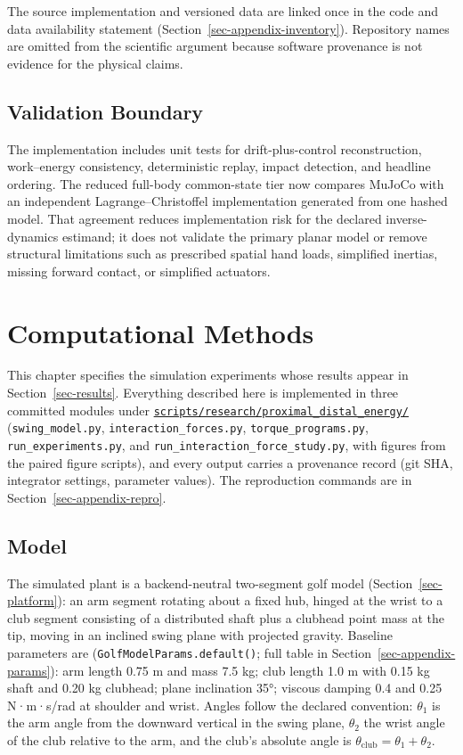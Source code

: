 \documentclass[
  letterpaper,
]{report}
\begin{document}
The source implementation and versioned data are linked once in the code
and data availability statement (Section~\ref{sec-appendix-inventory}).
Repository names are omitted from the scientific argument because
software provenance is not evidence for the physical claims.

\section{Validation Boundary}\label{validation-boundary}

The implementation includes unit tests for drift-plus-control
reconstruction, work--energy consistency, deterministic replay, impact
detection, and headline ordering. The reduced full-body common-state
tier now compares MuJoCo with an independent Lagrange--Christoffel
implementation generated from one hashed model. That agreement reduces
implementation risk for the declared inverse-dynamics estimand; it does
not validate the primary planar model or remove structural limitations
such as prescribed spatial hand loads, simplified inertias, missing
forward contact, or simplified actuators.

\chapter{Computational Methods}\label{sec-methods}

This chapter specifies the simulation experiments whose results appear
in Section~\ref{sec-results}. Everything described here is implemented
in three committed modules under
\href{https://github.com/D-sorganization/UpstreamDrift/tree/main/scripts/research/proximal_distal_energy}{\texttt{scripts/research/proximal\_distal\_energy/}}
(\texttt{swing\_model.py}, \texttt{interaction\_forces.py},
\texttt{torque\_programs.py}, \texttt{run\_experiments.py}, and
\texttt{run\_interaction\_force\_study.py}, with figures from the paired
figure scripts), and every output carries a provenance record (git SHA,
integrator settings, parameter values). The reproduction commands are in
Section~\ref{sec-appendix-repro}.

\section{Model}\label{sec-methods-model}

The simulated plant is a backend-neutral two-segment golf model
(Section~\ref{sec-platform}): an arm segment rotating about a fixed hub,
hinged at the wrist to a club segment consisting of a distributed shaft
plus a clubhead point mass at the tip, moving in an inclined swing plane
with projected gravity. Baseline parameters are
(\texttt{GolfModelParams.default()}; full table in
Section~\ref{sec-appendix-params}): arm length 0.75 m and mass 7.5 kg;
club length 1.0 m with 0.15 kg shaft and 0.20 kg clubhead; plane
inclination 35°; viscous damping 0.4 and 0.25 N·m·s/rad at shoulder and
wrist. Angles follow the declared convention: \(\theta_1\) is the arm
angle from the downward vertical in the swing plane, \(\theta_2\) the
wrist angle of the club relative to the arm, and the club's absolute
angle is \(\theta_{\mathrm{club}} = \theta_1 + \theta_2\).
\end{document}
